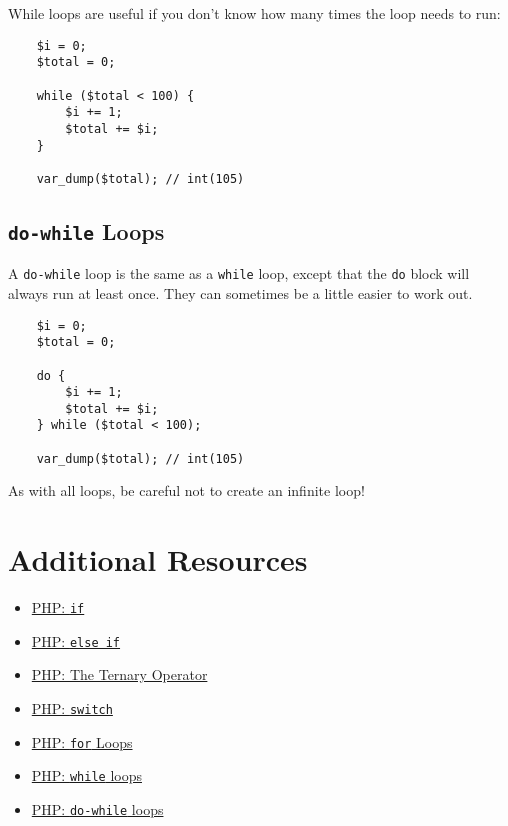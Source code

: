While loops are useful if you don't know how many times the loop needs to run:

\begin{verbatim}
    $i = 0;
    $total = 0;

    while ($total < 100) {
        $i += 1;
        $total += $i;
    }

    var_dump($total); // int(105)
\end{verbatim}

\subsection{\texttt{do-while} Loops}

A \texttt{do-while} loop is the same as a \texttt{while} loop, except that the \texttt{do} block will always run at least once. They can sometimes be a little easier to work out.

\begin{verbatim}
    $i = 0;
    $total = 0;

    do {
        $i += 1;
        $total += $i;
    } while ($total < 100);

    var_dump($total); // int(105)
\end{verbatim}

\hr

As with all loops, be careful not to create an infinite loop!


\section{Additional Resources}

\begin{itemize}[leftmargin=*]
    \item \href{http://www.php.net/manual/en/control-structures.if.php}{PHP: \texttt{if}}
    \item \href{http://www.php.net/manual/en/control-structures.elseif.php}{PHP: \texttt{else if}}
    \item \href{https://www.php.net/manual/en/language.operators.comparison.php#language.operators.comparison.ternary}{PHP: The Ternary Operator}
    \item \href{http://www.php.net/manual/en/control-structures.switch.php}{PHP: \texttt{switch}}
    \item \href{http://www.php.net/manual/en/control-structures.for.php}{PHP: \texttt{for} Loops}
    \item \href{http://www.php.net/manual/en/control-structures.while.php}{PHP: \texttt{while} loops}
    \item \href{http://www.php.net/manual/en/control-structures.do.while.php}{PHP: \texttt{do-while} loops}
\end{itemize}
